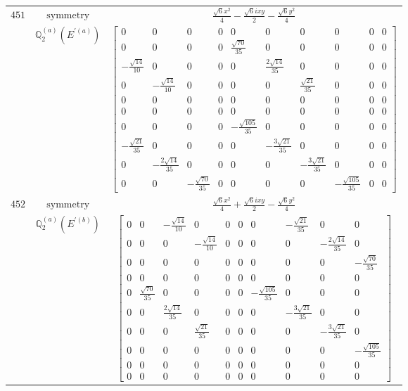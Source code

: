 \documentclass[fleqn,8pt,landscape]{jsarticle}
\begin{document}
\begin{longtable}{ccc}
$ 451 $ & $ \text{symmetry} $ & $ \frac{\sqrt{6} x^{2}}{4} - \frac{\sqrt{6} i x y}{2} - \frac{\sqrt{6} y^{2}}{4} $ \\
$  $ & $ \mathbb{Q}_{2}^{(a)}(E^{\prime(a)}) $ & $ \begin{bmatrix} 0 & 0 & 0 & 0 & 0 & 0 & 0 & 0 & 0 & 0 \\ 0 & 0 & 0 & 0 & \frac{\sqrt{70}}{35} & 0 & 0 & 0 & 0 & 0 \\ - \frac{\sqrt{14}}{10} & 0 & 0 & 0 & 0 & \frac{2 \sqrt{14}}{35} & 0 & 0 & 0 & 0 \\ 0 & - \frac{\sqrt{14}}{10} & 0 & 0 & 0 & 0 & \frac{\sqrt{21}}{35} & 0 & 0 & 0 \\ 0 & 0 & 0 & 0 & 0 & 0 & 0 & 0 & 0 & 0 \\ 0 & 0 & 0 & 0 & 0 & 0 & 0 & 0 & 0 & 0 \\ 0 & 0 & 0 & 0 & - \frac{\sqrt{105}}{35} & 0 & 0 & 0 & 0 & 0 \\ - \frac{\sqrt{21}}{35} & 0 & 0 & 0 & 0 & - \frac{3 \sqrt{21}}{35} & 0 & 0 & 0 & 0 \\ 0 & - \frac{2 \sqrt{14}}{35} & 0 & 0 & 0 & 0 & - \frac{3 \sqrt{21}}{35} & 0 & 0 & 0 \\ 0 & 0 & - \frac{\sqrt{70}}{35} & 0 & 0 & 0 & 0 & - \frac{\sqrt{105}}{35} & 0 & 0 \end{bmatrix} $ \\ \hline
$ 452 $ & $ \text{symmetry} $ & $ \frac{\sqrt{6} x^{2}}{4} + \frac{\sqrt{6} i x y}{2} - \frac{\sqrt{6} y^{2}}{4} $ \\
$  $ & $ \mathbb{Q}_{2}^{(a)}(E^{\prime(b)}) $ & $ \begin{bmatrix} 0 & 0 & - \frac{\sqrt{14}}{10} & 0 & 0 & 0 & 0 & - \frac{\sqrt{21}}{35} & 0 & 0 \\ 0 & 0 & 0 & - \frac{\sqrt{14}}{10} & 0 & 0 & 0 & 0 & - \frac{2 \sqrt{14}}{35} & 0 \\ 0 & 0 & 0 & 0 & 0 & 0 & 0 & 0 & 0 & - \frac{\sqrt{70}}{35} \\ 0 & 0 & 0 & 0 & 0 & 0 & 0 & 0 & 0 & 0 \\ 0 & \frac{\sqrt{70}}{35} & 0 & 0 & 0 & 0 & - \frac{\sqrt{105}}{35} & 0 & 0 & 0 \\ 0 & 0 & \frac{2 \sqrt{14}}{35} & 0 & 0 & 0 & 0 & - \frac{3 \sqrt{21}}{35} & 0 & 0 \\ 0 & 0 & 0 & \frac{\sqrt{21}}{35} & 0 & 0 & 0 & 0 & - \frac{3 \sqrt{21}}{35} & 0 \\ 0 & 0 & 0 & 0 & 0 & 0 & 0 & 0 & 0 & - \frac{\sqrt{105}}{35} \\ 0 & 0 & 0 & 0 & 0 & 0 & 0 & 0 & 0 & 0 \\ 0 & 0 & 0 & 0 & 0 & 0 & 0 & 0 & 0 & 0 \end{bmatrix} $ \\ \hline

\end{longtable}
\end{document}
